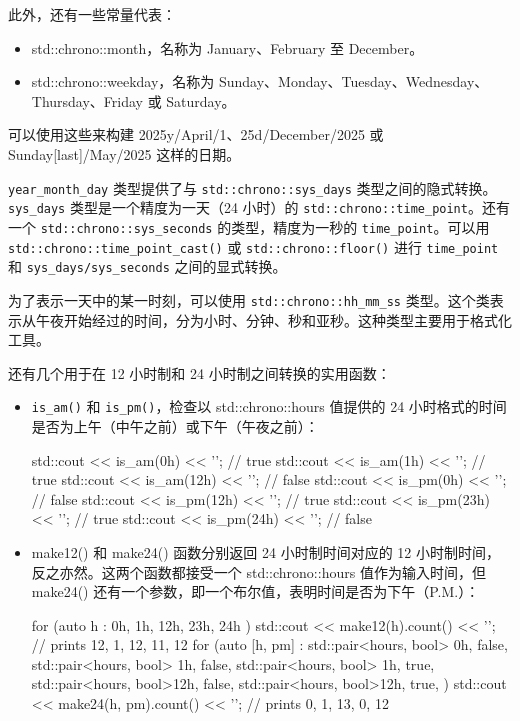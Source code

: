 此外，还有一些常量代表：

\begin{itemize}
\item
std::chrono::month，名称为 January、February 至 December。

\item
std::chrono::weekday，名称为 Sunday、Monday、Tuesday、Wednesday、Thursday、Friday 或 Saturday。
\end{itemize}

可以使用这些来构建 2025y/April/1、25d/December/2025 或 Sunday[last]/May/2025 这样的日期。

\verb|year_month_day| 类型提供了与 \verb|std::chrono::sys_days| 类型之间的隐式转换。\verb|sys_days| 类型是一个精度为一天（24 小时）的 \verb|std::chrono::time_point|。还有一个 \verb|std::chrono::sys_seconds| 的类型，精度为一秒的 \verb|time_point|。可以用 \verb|std::chrono::time_point_cast()| 或 \verb|std::chrono::floor()| 进行 \verb|time_point| 和 \verb|sys_days/sys_seconds| 之间的显式转换。

为了表示一天中的某一时刻，可以使用 \verb|std::chrono::hh_mm_ss| 类型。这个类表示从午夜开始经过的时间，分为小时、分钟、秒和亚秒。这种类型主要用于格式化工具。

还有几个用于在 12 小时制和 24 小时制之间转换的实用函数：

\begin{itemize}
\item
\verb|is_am()| 和 \verb|is_pm()|，检查以 std::chrono::hours 值提供的 24 小时格式的时间是否为上午（中午之前）或下午（午夜之前）：

\begin{cpp}
std::cout << is_am(0h)  << '\n'; // true
std::cout << is_am(1h)  << '\n'; // true
std::cout << is_am(12h) << '\n'; // false
std::cout << is_pm(0h)  << '\n'; // false
std::cout << is_pm(12h) << '\n'; // true
std::cout << is_pm(23h) << '\n'; // true
std::cout << is_pm(24h) << '\n'; // false
\end{cpp}

\item
make12() 和 make24() 函数分别返回 24 小时制时间对应的 12 小时制时间，反之亦然。这两个函数都接受一个 std::chrono::hours 值作为输入时间，但 make24() 还有一个参数，即一个布尔值，表明时间是否为下午（P.M.）：

\begin{cpp}
for (auto h : { 0h, 1h, 12h, 23h, 24h })
{
    std::cout << make12(h).count() << '\n';
    // prints 12, 1, 12, 11, 12
}
for (auto [h, pm] : {
    std::pair<hours, bool>{ 0h, false},
    std::pair<hours, bool>{ 1h, false},
    std::pair<hours, bool>{ 1h, true},
    std::pair<hours, bool>{12h, false},
    std::pair<hours, bool>{12h, true}, })
{
    std::cout << make24(h, pm).count() << '\n';
    // prints 0, 1, 13, 0, 12
}
\end{cpp}
\end{itemize}

